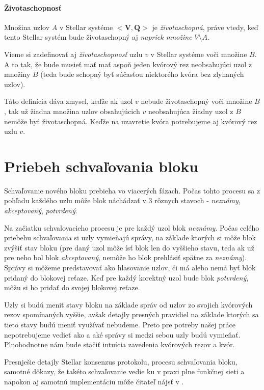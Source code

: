 \paragraph {Životaschopnosť}
Množina uzlov $A$ v Stellar systéme $<\textbf{V}, \textbf{Q}>$ je
\textit{životaschopná}, práve vtedy, keď tento Stellar systém bude životaschopný
aj \textit{napriek množine} $V \setminus A$.

\vspace{5mm}
Vieme si zadefinovať aj \textit{životaschopnosť} uzlu $v$ v Stellar systéme voči
množine $B$. A to tak, že bude musieť mať mať aspoň jeden kvórový rez neobsahujúci
uzol z množiny $B$ (teda bude schopný byť súčasťou niektorého kvóra bez zlyhaných uzlov).

Táto definícia dáva zmysel, keďže ak uzol $v$ nebude životaschopný voči množine $B$,
tak už žiadna množina uzlov obsahujúcich $v$ neobsahujúca žiadny uzol z $B$
nemôže byť životaschopná. Keďže na uzavretie kvóra potrebujeme aj kvórový rez uzlu $v$.

\section {Priebeh schvaľovania bloku}

Schvaľovanie nového bloku prebieha vo viacerých fázach. Počas tohto procesu sa 
z pohľadu každého uzlu môže blok náchádzať v 3 rôznych stavoch -
\textit{neznámy}, \textit{akceptovaný}, \textit{potvrdený}.

Na začiatku schvaľovacieho procesu je pre každý uzol blok \textit{neznámy}.
Počas celého priebehu schvaľovania si uzly vymieňajú správy, na základe ktorých
si môže blok zvýšiť stav bloku (pre daný uzol môže ísť blok len do vyššieho
stavu, teda ak už pre neho bol blok \textit{akceptovaný}, nemôže ho blok
prehlásiť spätne za \textit{neznámy}).
Správy si môžeme predstavovať ako hlasovanie uzlov, či má alebo nemá byť
blok pridaný do blokovej reťaze.
Keď pre každý korektný uzol bude blok \textit{potvrdený}, môžu si ho pridať
do svojej blokovej reťaze.

Uzly si budú meniť stavy bloku na základe správ od uzlov zo svojich kvórových rezov
spomínaných vyššie, avšak detajly presných pravidiel na základe ktorých sa tieto
stavy budú meniť využívať nebudeme.
Preto pre potreby našej práce nepotrebujeme vedieť ako a aké správy si medzi
sebou uzly budú vymieňať.
Plnohodnotne nám bude stačiť intuícia zavedenia kvórových rezov a kvór.

Presnješie detajly Stellar konsenzus protokolu, procesu schvaľovania bloku,
samotné dôkazy, že takéto schvaľovanie vedie ku v praxi plne funkčnej sieti a
napokon aj samotnú implementáciu môže čitateľ nájsť v \cite{mazieres2015stellar}.

